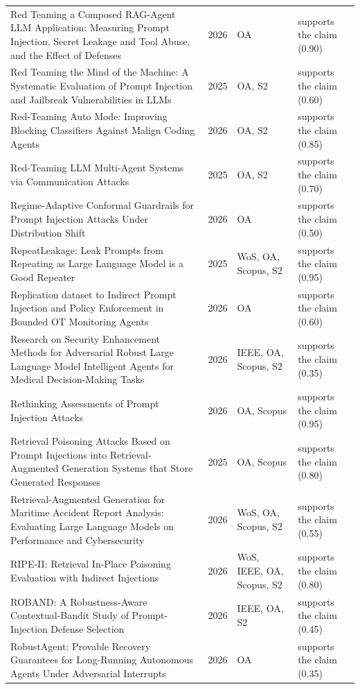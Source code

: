 \begin{longtable}{@{}%
  >{\raggedright\arraybackslash}p{}c%
  >{\raggedright\arraybackslash}p{}%
  >{\raggedright\arraybackslash}p{}@{}}
Red Teaming a Composed RAG-Agent LLM Application: Measuring Prompt Injection, Secret Leakage and Tool Abuse, and the Effect of Defenses & 2026 & OA & supports the claim (0.90) \\
Red Teaming the Mind of the Machine: A Systematic Evaluation of Prompt Injection and Jailbreak Vulnerabilities in LLMs & 2025 & OA, S2 & supports the claim (0.60) \\
Red-Teaming Auto Mode: Improving Blocking Classifiers Against Malign Coding Agents & 2026 & OA, S2 & supports the claim (0.85) \\
Red-Teaming LLM Multi-Agent Systems via Communication Attacks & 2025 & OA, S2 & supports the claim (0.70) \\
Regime-Adaptive Conformal Guardrails for Prompt Injection Attacks Under Distribution Shift & 2026 & OA & supports the claim (0.50) \\
RepeatLeakage: Leak Prompts from Repeating as Large Language Model is a Good Repeater & 2025 & WoS, OA, Scopus, S2 & supports the claim (0.95) \\
Replication dataset to \textquotedbl{}Indirect Prompt Injection and Policy Enforcement in Bounded OT Monitoring Agents\textquotedbl{} & 2026 & OA & supports the claim (0.60) \\
Research on Security Enhancement Methods for Adversarial Robust Large Language Model Intelligent Agents for Medical Decision-Making Tasks & 2026 & IEEE, OA, Scopus, S2 & supports the claim (0.35) \\
Rethinking Assessments of Prompt Injection Attacks & 2026 & OA, Scopus & supports the claim (0.95) \\
Retrieval Poisoning Attacks Based on Prompt Injections into Retrieval-Augmented Generation Systems that Store Generated Responses & 2025 & OA, Scopus & supports the claim (0.80) \\
Retrieval-Augmented Generation for Maritime Accident Report Analysis: Evaluating Large Language Models on Performance and Cybersecurity & 2026 & WoS, OA, Scopus, S2 & supports the claim (0.55) \\
RIPE-II: Retrieval In-Place Poisoning Evaluation with Indirect Injections & 2026 & WoS, IEEE, OA, Scopus, S2 & supports the claim (0.80) \\
ROBAND: A Robustness-Aware Contextual-Bandit Study of Prompt-Injection Defense Selection & 2026 & IEEE, OA, S2 & supports the claim (0.45) \\
RobustAgent: Provable Recovery Guarantees for Long-Running Autonomous Agents Under Adversarial Interrupts & 2026 & OA & supports the claim (0.35) \\

\end{longtable}
